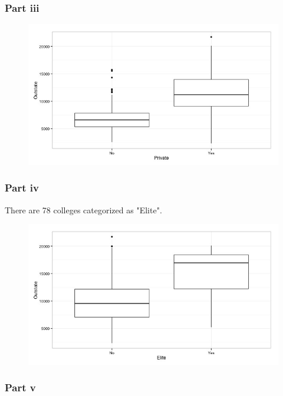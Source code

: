 \documentclass[11pt]{article}
\begin{document}
\subsubsection*{Part iii}

\begin{figure}[H]
	\centering
	\includegraphics[width=6.5in]{8ciii.jpeg}
\end{figure}

\subsubsection*{Part iv}

There are 78 colleges categorized as "Elite".

\begin{figure}[H]
	\centering
	\includegraphics[width=6.5in]{8civ.jpeg}
\end{figure}

\subsubsection*{Part v}
\end{document}
